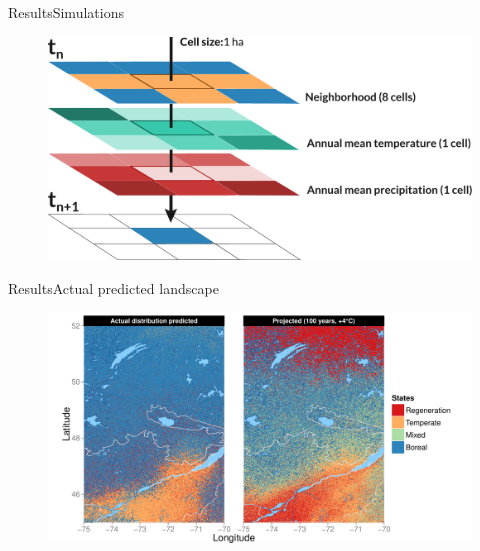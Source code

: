 \documentclass[10pt,aspectratio=149]{beamer}
\begin{document}
\begin{frame}{Results}{Simulations}

		\begin{figure}
			\includegraphics[width=1.2\paperheight]{Figs/explicit.pdf}
		\end{figure}
		
	
\end{frame}



\begin{frame}[t]{Results}{Actual predicted landscape}

		\begin{figure}
			\vspace{-1.5em}
			\includegraphics[height=0.79\paperheight]{Figs/outModel.pdf}
		\end{figure}

\end{frame}

\end{document}
